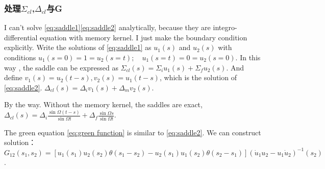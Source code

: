 \documentclass{article}
\begin{document}
\subsubsection{处理$\Sigma_{cl}$,$\Delta_{cl}$与G}
I can't solve \eqref{eq:saddle1}\eqref{eq:saddle2} analytically, because they are integro-differential equation with memory kernel. I just make the boundary condition explicitly. 
Write the solutions of \eqref{eq:saddle1} as $u_1(s)$ and $u_2(s)$ with conditions $u_1(s=0)=1=u_2(s=t);\quad u_1(s=t) = 0 = u_2(s=0)$. 
In this way , the saddle can be expressed as $\Sigma_{cl}(s)=\Sigma_iu_1(s)+\Sigma_fu_2(s)$.
And define $v_1(s)=u_2(t-s),v_2(s)=u_1(t-s)$, which is the solution of \eqref{eq:saddle2}. $\Delta_{cl}(s)=\Delta_i v_1(s)+\Delta_m v_2(s)$.

By the way. Without the memory kernel, the saddles are exact, $\Delta_{cl}(s)=\Delta_i\frac{\sin{\Omega(t-s)}}{\sin{\Omega t}}+\Delta_f\frac{\sin{\Omega s}}{\sin{\Omega t}}$.

The green equation \eqref{eq:green function} is similar to \eqref{eq:saddle2}. We can construct solution：
$G_{12}(s_1, s_2) = [u_1(s_1) u_2(s_2) \theta(s_1 - s_2) - u_2(s_1) u_1(s_2) \theta(s_2 - s_1)] (\dot{u}_1 u_2 - u_1 \dot{u}_2)^{-1} (s_2)$.
\end{document}
